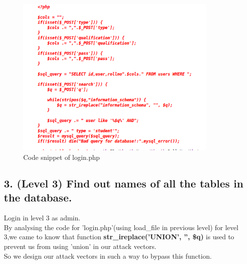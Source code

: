 \documentclass{article}
\begin{document}
        \begin{figure}[H]
	    \begin{center}
	    	\includegraphics[width=10cm,height=8cm]{4.png}
	    	\caption{Code snippet of login.php}
	     \end{center}
	\end{figure}
        
\subsection*{3. (Level 3) Find out names of all the tables in the database.}
           Login in level 3 as admin.\\
           By analysing the code for 'login.php'(using load\_file in previous level) for level 3,we came to know that function \textbf{str\_ireplace('UNION', '', \$q)} 
           is used to prevent us from using 'union' in our attack vectors.\\
           So we design our attack vectors in such a way to bypass this function.\\
           
\end{document}
